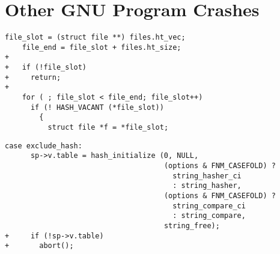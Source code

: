 \section{Other GNU Program Crashes}

\begin{lstlisting}[label={lst:make/calloc},firstnumber=278, caption={\texttt{make} crashes when \texttt{calloc} returns an error. The offending code is in the Make 4.2 source code, in \texttt{file.c:278}.}]
	file_slot = (struct file **) files.ht_vec;
	file_end = file_slot + files.ht_size;
+	
+	if (!file_slot)
+	  return;
+	
	for ( ; file_slot < file_end; file_slot++)
	  if (! HASH_VACANT (*file_slot))
	    {
	      struct file *f = *file_slot;                                          
\end{lstlisting}

\begin{lstlisting}[label={lst:grep/malloc},firstnumber=265, caption={\texttt{grep} crashes when \texttt{malloc} returns an error. The offending code is in the Grep 2.25 source code, in \texttt{lib/exclude.c:265}.}]
	case exclude_hash:
	  sp->v.table = hash_initialize (0, NULL,
	                                 (options & FNM_CASEFOLD) ?
	                                   string_hasher_ci
	                                   : string_hasher,
	                                 (options & FNM_CASEFOLD) ?
	                                   string_compare_ci
	                                   : string_compare,
	                                 string_free);
+	  if (!sp->v.table)
+	    abort();
                                          
\end{lstlisting}